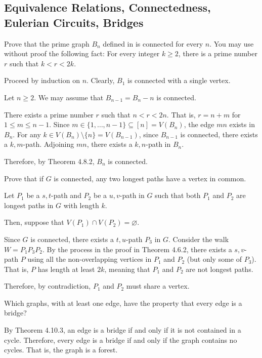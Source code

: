 \documentclass[class=math239,notes,tikz]{agony}
\begin{document}
\setcounter{subsection}{9}
\subsection{Equivalence Relations, Connectedness, Eulerian Circuits, Bridges}

\begin{xca}
  Prove that the prime graph $B_n$ defined in  is connected for every $n$.
  You may use without proof the following fact:
  For every integer $k \geq 2$,
  there is a prime number $r$ such that $k < r < 2k$.
\end{xca}
\begin{prf}
  Proceed by induction on $n$.
  Clearly, $B_1$ is connected with a single vertex.

  Let $n \geq 2$. We may assume that $B_{n-1} = B_n - n$ is connected.

  There exists a prime number $r$ such that $n < r < 2n$.
  That is, $r = n + m$ for $1 \leq m \leq n-1$.
  Since $m \in \{1,\dotsc,n-1\} \subseteq [n] = V(B_n)$,
  the edge $mn$ exists in $B_n$.
  For any $k \in V(B_n) \setminus \{n\} = V(B_{n-1})$,
  since $B_{n-1}$ is connected, there exists a $k,m$-path.
  Adjoining $mn$, there exists a $k,n$-path in $B_n$.

  Therefore, by Theorem 4.8.2, $B_n$ is connected.
\end{prf}

\begin{xca}
  Prove that if $G$ is connected,
  any two longest paths have a vertex in common.
\end{xca}
\begin{prf}
  Let $P_1$ be a $s,t$-path and $P_2$ be a $u,v$-path in $G$
  such that both $P_1$ and $P_2$ are longest paths in $G$ with length $k$.

  Then, suppose that $V(P_1) \cap V(P_2) = \varnothing$.

  Since $G$ is connected, there exists a $t,u$-path $P_3$ in $G$.
  Consider the walk $W = P_1P_3P_2$.
  By the process in the proof in Theorem 4.6.2,
  there exists a $s,v$-path $P$ using all the non-overlapping
  vertices in $P_1$ and $P_2$ (but only some of $P_3$).
  That is, $P$ has length at least $2k$, meaning that $P_1$ and $P_2$ are not longest paths.

  Therefore, by contradiction, $P_1$ and $P_2$ must share a vertex.
\end{prf}

\begin{xca}
  Which graphs, with at least one edge,
  have the property that every edge is a bridge?
\end{xca}
\begin{sol}
  By Theorem 4.10.3, an edge is a bridge if and only if it is not contained in a cycle.
  Therefore, every edge is a bridge if and only if the graph contains no cycles.
  That is, the graph is a forest.
\end{sol}
\end{document}
